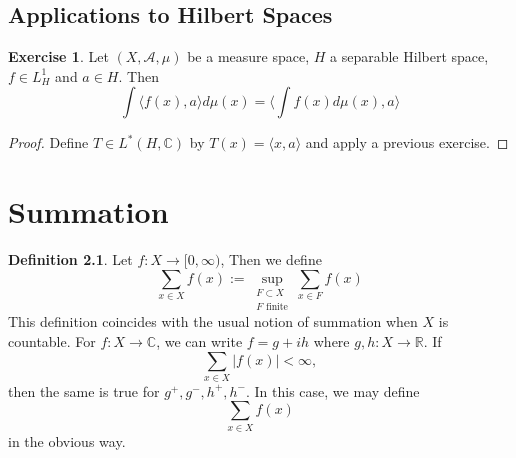 \documentclass{book}
\theoremstyle{definition}
\newtheorem{defn}[definition]{Definition}
\newtheorem{ex}[definition]{Exercise}
\newcommand{\C}{\mathbb{C}}
\newcommand{\R}{\mathbb{R}}
\newcommand{\MA}{\mathcal{A}}
\newcommand{\lex}[1]{\label{ex:#1}}
\newcommand{\ld}[1]{\label{defn:#1}}
\DeclareMathOperator*{\0}{\mbf{0}}
\DeclareMathOperator*{\1}{\mbf{1}}
\renewcommand{\r}{\rangle}
\renewcommand{\l}{\langle}
\newcommand{\Rg}{[0,\infty)}
\begin{document}
	
	
	
	
	
	
	
	
	
	
	
	
	
	
	
	
	
	\newpage
	\section{Applications to Hilbert Spaces}	
	
	\begin{ex} \lex{00000} 
	Let $(X, \MA, \mu)$ be a measure space, $H$ a separable Hilbert space, $f \in L^1_H$ and $a \in H$. Then $$\int \l f(x), a \r d\mu(x) = \bigg \l \int f(x) d \mu(x) , a\bigg \r$$ 
	\end{ex}	
	
	\begin{proof}
	Define $T \in L^*(H, \C)$ by $T(x) = \l x, a \r$ and apply a previous exercise.
	\end{proof}
	
	
	
	
	
	
	
	
	
	
	
	
	
	
	
	
	
	
	
	
	
	
	
	
	
	
	
	

	
	

	
	\appendix
	
	\chapter{Summation}
	
	\begin{defn} \ld{00000} 
		Let $f:X \rightarrow \Rg$, Then we define $$\sum_{x \in X} f(x) := \sup_{\substack{F \subset X \\ F \text{ finite}}} \sum_{x \in F} f(x)$$ This definition coincides with the usual notion of summation when $X$ is countable. For $f:X \rightarrow \C$, we can write $f = g +ih$ where $g,h:X \rightarrow \R$. If $$\sum_{x \in X}|f(x)| < \infty,$$ then the same is true for $g^+,g^-,h^+,h^-$. In this case, we may define $$\sum_{x \in X} f(x)$$ in the obvious way.
	\end{defn} 
	
\end{document}
